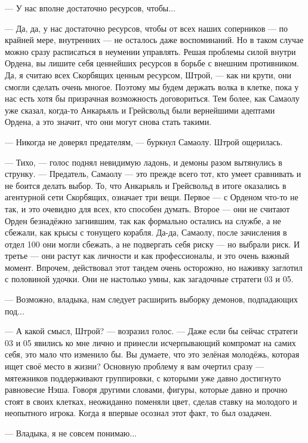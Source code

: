 --- У нас вполне достаточно ресурсов, чтобы...

--- Да, да, у нас достаточно ресурсов, чтобы от всех наших соперников --- по крайней мере, внутренних --- не осталось даже воспоминаний.
Но в таком случае можно сразу расписаться в неумении управлять.
Решая проблемы силой внутри Ордена, вы лишите себя ценнейших ресурсов в борьбе с внешним противником.
Да, я считаю всех Скорбящих ценным ресурсом, Штрой, --- как ни крути, они смогли сделать очень многое.
Поэтому мы будем держать волка в клетке, пока у нас есть хотя бы призрачная возможность договориться.
Тем более, как Самаолу уже сказал, когда-то Анкарьяль и Грейсвольд были вернейшими адептами Ордена, а это значит, что они могут снова стать такими.

--- Никогда не доверял предателям, --- буркнул Самаолу.
Штрой ощерилась.

--- Тихо, --- голос поднял невидимую ладонь, и демоны разом вытянулись в струнку.
--- Предатель, Самаолу --- это прежде всего тот, кто умеет сравнивать и не боится делать выбор.
То, что Анкарьяль и Грейсвольд в итоге оказались в агентурной сети Скорбящих, означает три вещи.
Первое --- с Орденом что-то не так, и это очевидно для всех, кто способен думать.
Второе --- они не считают Орден безнадёжно загнившим, так как формально остались на службе, а не сбежали, как крысы с тонущего корабля.
Да-да, Самаолу, после зачисления в отдел 100 они могли сбежать, а не подвергать себя риску --- но выбрали риск.
И третье --- они растут как личности и как профессионалы, и это очень важный момент.
Впрочем, действовал этот тандем очень осторожно, но наживку заглотил с половиной удочки.
Они не настолько умны, как загадочные стратеги 03 и 05.

--- Возможно, владыка, нам следует расширить выборку демонов, подпадающих под...

--- А какой смысл, Штрой? --- возразил голос.
--- Даже если бы сейчас стратеги 03 и 05 явились ко мне лично и принесли исчерпывающий компромат на самих себя, это мало что изменило бы.
Вы думаете, что это зелёная молодёжь, которая ищет своё место в жизни?
Основную проблему я вам очертил сразу --- мятежников поддерживают группировки, с которыми уже давно достигнуто равновесие Нэша.
Говоря другими словами, фигуры, которые давно и прочно стоят в своих клетках, неожиданно поменяли цвет, сделав ставку на молодого и неопытного игрока.
Когда я впервые осознал этот факт, то был озадачен.

--- Владыка, я не совсем понимаю...

